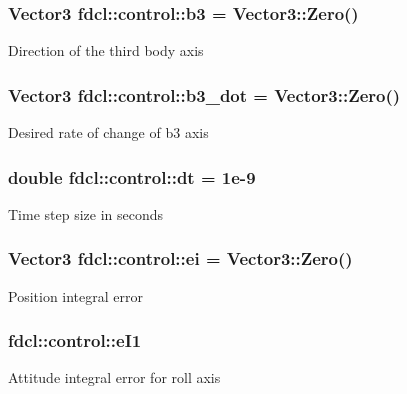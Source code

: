 \subsubsection[{\texorpdfstring{b3}{b3}}]{\setlength{\rightskip}{0pt plus 5cm}Vector3 fdcl\+::control\+::b3 = Vector3\+::\+Zero()}\hypertarget{classfdcl_1_1control_a7f1776cc82d2375ff788a639baa4064b}{}\label{classfdcl_1_1control_a7f1776cc82d2375ff788a639baa4064b}
Direction of the third body axis 
\subsubsection[{\texorpdfstring{b3\+\_\+dot}{b3_dot}}]{\setlength{\rightskip}{0pt plus 5cm}Vector3 fdcl\+::control\+::b3\+\_\+dot = Vector3\+::\+Zero()}\hypertarget{classfdcl_1_1control_a6c9ba83faa7eae7dde44e9619e08d726}{}\label{classfdcl_1_1control_a6c9ba83faa7eae7dde44e9619e08d726}
Desired rate of change of b3 axis 
\subsubsection[{\texorpdfstring{dt}{dt}}]{\setlength{\rightskip}{0pt plus 5cm}double fdcl\+::control\+::dt = 1e-\/9}\hypertarget{classfdcl_1_1control_ab88203b25382616db08db2f4a3cea481}{}\label{classfdcl_1_1control_ab88203b25382616db08db2f4a3cea481}
Time step size in seconds 
\subsubsection[{\texorpdfstring{ei}{ei}}]{\setlength{\rightskip}{0pt plus 5cm}Vector3 fdcl\+::control\+::ei = Vector3\+::\+Zero()}\hypertarget{classfdcl_1_1control_a4a67e30ea06e07869210033406cf58cb}{}\label{classfdcl_1_1control_a4a67e30ea06e07869210033406cf58cb}
Position integral error 
\subsubsection[{\texorpdfstring{e\+I1}{eI1}}]{ fdcl\+::control\+::e\+I1}\hypertarget{classfdcl_1_1control_aa8cc0bd5f3521e4c0460f086b0d81166}{}\label{classfdcl_1_1control_aa8cc0bd5f3521e4c0460f086b0d81166}
Attitude integral error for roll axis 
